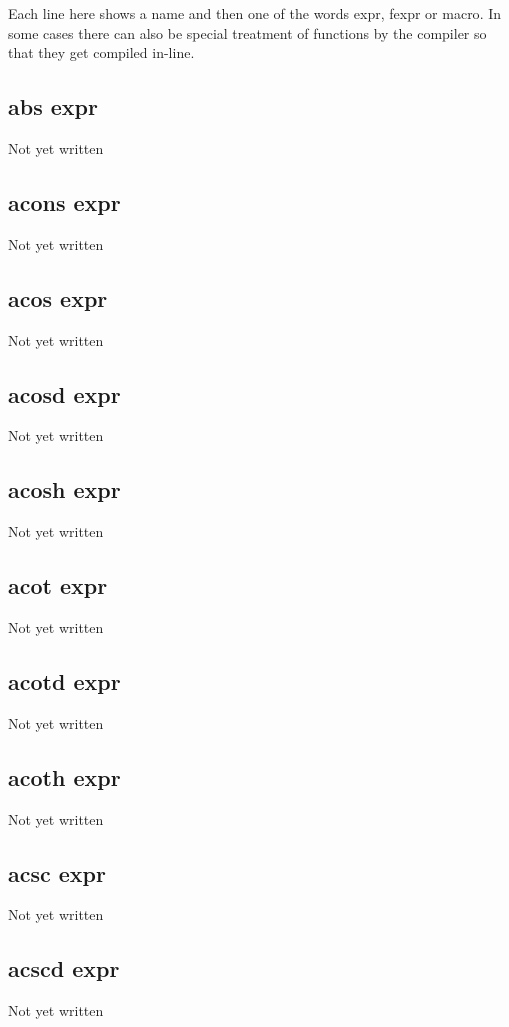 \documentclass[a4paper,11pt]{article}
\begin{document}
{   Each line here shows a name and then one of the words {\ttfamily expr},
   {\ttfamily fexpr} or {\ttfamily macro}. In some cases there can also be special
   treatment of functions by the compiler so that they get compiled in-line.
  

\subsection{\ttfamily abs expr}
   Not yet written

\subsection{\ttfamily acons expr}
   Not yet written

\subsection{\ttfamily acos expr}
   Not yet written

\subsection{\ttfamily acosd expr}
   Not yet written

\subsection{\ttfamily acosh expr}
   Not yet written

\subsection{\ttfamily acot expr}
   Not yet written

\subsection{\ttfamily acotd expr}
   Not yet written

\subsection{\ttfamily acoth expr}
   Not yet written

\subsection{\ttfamily acsc expr}
   Not yet written

\subsection{\ttfamily acscd expr}
   Not yet written

}
\end{document}
